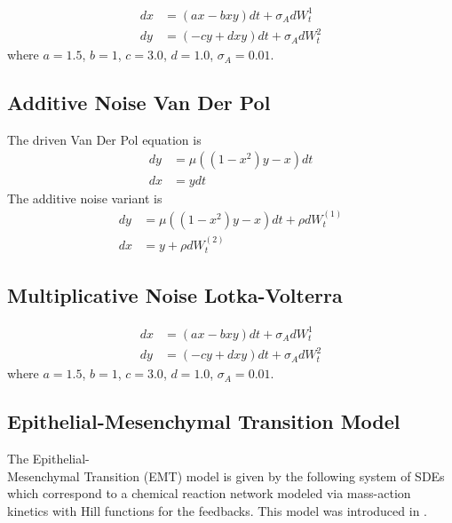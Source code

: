 \documentclass{article}
\begin{document}
\begin{align}
dx & =\left(ax-bxy\right)dt+\sigma_{A}dW_{t}^{1}\nonumber \\
dy & =\left(-cy+dxy\right)dt+\sigma_{A}dW_{t}^{2}\label{eq:lotka_add}
\end{align}
where $a=1.5$, $b=1$, $c=3.0$, $d=1.0$, $\sigma_{A}=0.01$.

\subsection{Additive Noise Van Der Pol}

The driven Van Der Pol equation is
\begin{align}
dy & =\mu((1-x^{2})y-x)dt\nonumber \\
dx & =ydt\label{eq:van_der_pol}
\end{align}
The additive noise variant is
\begin{align}
dy & =\mu((1-x^{2})y-x)dt+\rho dW_{t}^{(1)}\nonumber \\
dx & =y+\rho dW_{t}^{(2)}\label{eq:van_der_pol_add}
\end{align}

\subsection{Multiplicative Noise Lotka-Volterra}

\begin{align}
dx & =\left(ax-bxy\right)dt+\sigma_{A}dW_{t}^{1}\nonumber \\
dy & =\left(-cy+dxy\right)dt+\sigma_{A}dW_{t}^{2}\label{eq:lotka_mult}
\end{align}
where $a=1.5$, $b=1$, $c=3.0$, $d=1.0$, $\sigma_{A}=0.01$.

\subsection{Epithelial-Mesenchymal Transition Model \label{subsec:Epithelial-Mesenchymal-Transitio}}

The Epithelial-\\
Mesenchymal Transition (EMT) model is given by the
following system of SDEs which correspond to a chemical reaction network
modeled via mass-action kinetics with Hill functions for the feedbacks.
This model was introduced in \cite{RN3358}.
\end{document}
